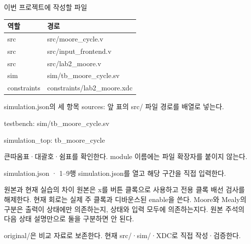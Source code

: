 \begin{frame}{이번 프로젝트에 작성할 파일}
\small
\begin{center}\renewcommand{\arraystretch}{1.55}\begin{tabular}{ll}
역할 & 경로\\\hline
src & src/moore\_cycle.v\\
src & src/input\_frontend.v\\
src & src/lab2\_moore.v\\
sim & sim/tb\_moore\_cycle.sv\\
constraints & constraints/lab2\_moore.xdc\\
\end{tabular}\end{center}
\end{frame}

\begin{frame}{simulation.json의 세 항목}
\small
sources: 앞 표의 src/ 파일 경로를 배열로 넣는다.\par\vspace{0.26cm}testbench: sim/tb\_moore\_cycle.sv\par\vspace{0.26cm}simulation\_top: tb\_moore\_cycle\par\vspace{0.26cm}큰따옴표·대괄호·쉼표를 확인한다. module 이름에는 파일 확장자를 붙이지 않는다.\par
\end{frame}

\begin{frame}{simulation.json · 1–9행}
\small
simulation.json를 열고 해당 구간을 직접 입력한다.\par\vspace{0.4cm}\par\vspace{0.4cm}
\end{frame}

\begin{frame}{원본과 현재 실습의 차이}
\small
원본은 x를 버튼 클록으로 사용하고 전용 클록 배선 검사를 해제한다. 현재 회로는 실제 주 클록과 디바운스된 enable을 쓴다. Moore와 Mealy의 구분은 출력이 상태에만 의존하는지, 상태와 입력 모두에 의존하는지다. 원본 주석의 다음 상태 설명만으로 둘을 구분하면 안 된다.\par\vspace{0.26cm}original/은 비교 자료로 보존한다. 현재 src/·sim/·XDC로 직접 작성·검증한다.\par
\end{frame}

